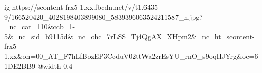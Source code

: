  
 
 
 
 

\ifcmt
  ig https://scontent-frx5-1.xx.fbcdn.net/v/t1.6435-9/166520420_4028198403899080_5839396063524211587_n.jpg?_nc_cat=110&ccb=1-5&_nc_sid=b9115d&_nc_ohc=7rLSS_Tj4QgAX_XHpm2&_nc_ht=scontent-frx5-1.xx&oh=00_AT_F7hLfBozEP3CeduV02ttWa2zrEsYU_rnO_s9oqHJYrg&oe=61DE2BB9
  @width 0.4
\fi
